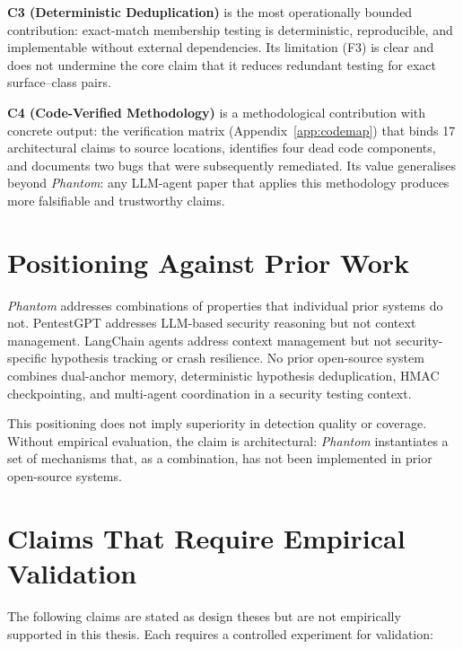 \documentclass[12pt, a4paper, oneside, openany]{book}
\newcommand{\Phant}{\textit{Phantom}}
\begin{document}
\textbf{C3 (Deterministic Deduplication)} is the most operationally
bounded contribution: exact-match membership testing is deterministic,
reproducible, and implementable without external dependencies.  Its
limitation (F3) is clear and does not undermine the core claim that
it reduces redundant testing for exact surface--class pairs.

\textbf{C4 (Code-Verified Methodology)} is a methodological
contribution with concrete output: the verification matrix
(Appendix~\ref{app:codemap}) that binds 17 architectural claims to
source locations, identifies four dead code components, and
documents two bugs that were subsequently remediated.  Its value
generalises beyond \Phant{}: any LLM-agent paper that applies this
methodology produces more falsifiable and trustworthy claims.

\section{Positioning Against Prior Work}

\Phant{} addresses combinations of properties that individual prior
systems do not.  PentestGPT addresses LLM-based security reasoning
but not context management.  LangChain agents address context
management but not security-specific hypothesis tracking or crash
resilience.  No prior open-source system combines dual-anchor memory,
deterministic hypothesis deduplication, HMAC checkpointing, and
multi-agent coordination in a security testing context.

This positioning does not imply superiority in detection quality or
coverage.  Without empirical evaluation, the claim is architectural:
\Phant{} instantiates a set of mechanisms that, as a combination,
has not been implemented in prior open-source systems.

\section{Claims That Require Empirical Validation}
\label{sec:eval_method}

The following claims are stated as design theses but are not
empirically supported in this thesis.  Each requires a controlled
experiment for validation:
\end{document}
